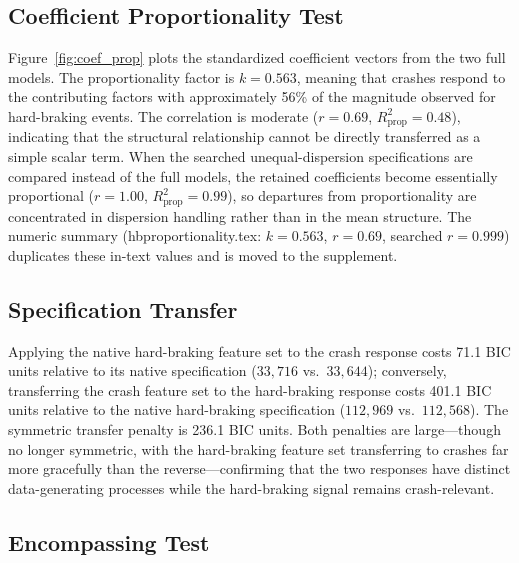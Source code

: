 \documentclass[letterpaper,8pt]{extarticle}  %
\newcommand{\file}[1]{{\ttfamily\def\_{\textunderscore\allowbreak}#1}}
\begin{document}
\begin{doublespacing}
\begin{linenumbers}


\FloatBarrier

\subsection{Coefficient Proportionality Test}\label{sec:coef-prop-note}

Figure~\ref{fig:coef_prop} plots the standardized coefficient vectors from the two full models. The proportionality factor is $k = 0.563$, meaning that crashes respond to the contributing factors with approximately 56\% of the magnitude observed for hard-braking events. The correlation is moderate ($r = 0.69$, $R^2_{\text{prop}} = 0.48$), indicating that the structural relationship cannot be directly transferred as a simple scalar term. When the searched unequal-dispersion specifications are compared instead of the full models, the retained coefficients become essentially proportional ($r = 1.00$, $R^2_{\text{prop}} = 0.99$), so departures from proportionality are concentrated in dispersion handling rather than in the mean structure. The numeric summary (\file{hb\_proportionality.tex}: $k=0.563$, $r=0.69$, searched $r=0.999$) duplicates these in-text values and is moved to the supplement.



\FloatBarrier



\subsection{Specification Transfer}

Applying the native hard-braking feature set to the crash response costs 71.1 BIC units relative to its native specification ($33{,}716$ vs.\ $33{,}644$); conversely, transferring the crash feature set to the hard-braking response costs 401.1 BIC units relative to the native hard-braking specification ($112{,}969$ vs.\ $112{,}568$). The symmetric transfer penalty is 236.1 BIC units. Both penalties are large---though no longer symmetric, with the hard-braking feature set transferring to crashes far more gracefully than the reverse---confirming that the two responses have distinct data-generating processes while the hard-braking signal remains crash-relevant.



\FloatBarrier


\subsection{Encompassing Test}


\end{linenumbers}
\end{doublespacing}
\end{document}
